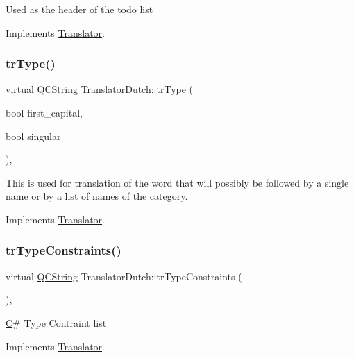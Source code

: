 Used as the header of the todo list 

Implements \mbox{\hyperlink{class_translator}{Translator}}.

\mbox{\label{class_translator_dutch_a565beafed04a4af76616012db83b66c9}} 
\subsubsection{\texorpdfstring{trType()}{trType()}}
{\footnotesize\ttfamily virtual \mbox{\hyperlink{class_q_c_string}{Q\+C\+String}} Translator\+Dutch\+::tr\+Type (\begin{DoxyParamCaption}\item[{bool}]{first\+\_\+capital,  }\item[{bool}]{singular }\end{DoxyParamCaption})\hspace{0.3cm}{\ttfamily [inline]}, {\ttfamily [virtual]}}

This is used for translation of the word that will possibly be followed by a single name or by a list of names of the category. 

Implements \mbox{\hyperlink{class_translator}{Translator}}.

\mbox{\label{class_translator_dutch_a27f6a6b19fd8b97867808ad55be5edd9}} 
\subsubsection{\texorpdfstring{trTypeConstraints()}{trTypeConstraints()}}
{\footnotesize\ttfamily virtual \mbox{\hyperlink{class_q_c_string}{Q\+C\+String}} Translator\+Dutch\+::tr\+Type\+Constraints (\begin{DoxyParamCaption}{ }\end{DoxyParamCaption})\hspace{0.3cm}{\ttfamily [inline]}, {\ttfamily [virtual]}}

\mbox{\hyperlink{class_c}{C}}\# Type Contraint list 

Implements \mbox{\hyperlink{class_translator}{Translator}}.

\mbox{\label{class_translator_dutch_a1e69c129e9cab873cabc4ac90a708f61}} 
